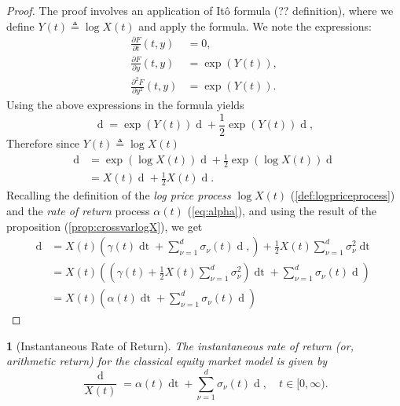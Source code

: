 \documentclass[british]{amsart}
\numberwithin{equation}{section}
\numberwithin{figure}{section}
\theoremstyle{plain}
\theoremstyle{definition}
\theoremstyle{plain}
\theoremstyle{plain}
\theoremstyle{plain}
\theoremstyle{remark}
\theoremstyle{plain}
\newtheorem{cor}[thm]{\protect\corollaryname}
\providecommand{\corollaryname}{Corollary}
\renewcommand{\d}[1]{\mathop{\mathrm{d}{#1}}}
\newcommand{\ranget}{t\in[0,\infty)}
\newcommand{\defeq}{\mathop{\triangleq}}
\begin{document}
\begin{proof}
	The proof involves an application of It\^{o} formula (?? definition), where we 
	define $Y(t) \defeq \log{X(t)}$ and apply the formula.
	We note the expressions:
	\begin{align*}
		\frac{\partial F}{\partial t}(t,y) &= 0, \\
		\frac{\partial F}{\partial y}(t,y) &= \exp(Y(t)), \\
		\frac{\partial^2 F}{\partial y^2}(t,y) &= \exp(Y(t)).
	\end{align*}
	Using the above expressions in the formula yields
	\begin{equation*}
		\d{F(t,Y(t))} = \exp(Y(t))\d{Y(t)} 
				+ \frac{1}{2}\exp(Y(t))\d{\langle Y \rangle_{t}},
	\end{equation*}
	Therefore since $Y(t) \defeq \log{X(t)}$ 
	\begin{align*}
		\d{X(t)} 
		& = 
						\exp(\log{X(t)})\d{\log{X(t)}} + 
						\frac{1}{2}\exp(\log{X(t)})\d{\langle \log{X} \rangle_{t}} \\
		& = X(t)\d{\log{X(t)}} + \frac{1}{2}X(t)\d{\langle \log{X} \rangle_{t}}.
	\end{align*}
	Recalling the definition of the \textit{log price process} $\log{X(t)}$ 
	(\ref{def:logpriceprocess}) and the \textit{rate of return} process 
	$\alpha(t)$ (\ref{eq:alpha}), and using the result of the proposition 
	(\ref{prop:crossvarlogX}), we get
	\begin{align*}
		\d{X(t)} 
					& = X(t)
					\left( 
						\gamma(t)\d{t} + \sum_{\nu=1}^{d} \sigma_{\nu}(t){\d{W_{\nu}(t)}}, 
					\right) + 
					\frac{1}{2} X(t) \sum_{\nu=1}^{d} \sigma_{\nu}^2\d{t} \\
					& =
					X(t)
						\left(
						\left( 
							\gamma(t) + \frac{1}{2} X(t) \sum_{\nu=1}^{d} \sigma_{\nu}^2
						\right)\d{t} + 
					  \sum_{\nu=1}^{d} \sigma_{\nu}(t){\d{W_{\nu}(t)}}
						\right) \\
					& =	X(t) \left(\alpha(t)\d{t} + \sum_{\nu=1}^{d} \sigma_{\nu}(t) \d{W_{\nu}(t)} \right)
	\end{align*}

\end{proof}

\begin{cor} 
	[Instantaneous Rate of Return]
	The instantaneous rate of return (or, arithmetic return) for the 
	classical equity market model is given by
\begin{equation}
	\frac{\d{X(t)}}{X(t)} = \alpha(t)\d{t} + \sum_{\nu=1}^{d}\sigma_{\nu}(t){\d{W_{\nu}(t)}},
	\quad \ranget.
\end{equation}
\end{cor}
\end{document}
